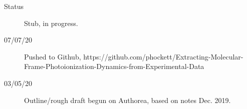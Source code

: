 \begin{description}
\item [{Status}] Stub, in progress.
\item [{07/07/20}] Pushed to Github, https://github.com/phockett/Extracting-Molecular-Frame-Photoionization-Dynamics-from-Experimental-Data
\item [{03/05/20}] Outline/rough draft begun on Authorea, based on notes Dec. 2019.
\end{description}